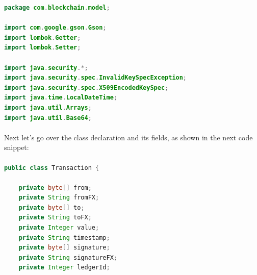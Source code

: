 \documentclass[12pt,a4paper]{report}
\begin{document}
 
\begin{lstlisting}[language=Java]
package com.blockchain.model;

import com.google.gson.Gson;
import lombok.Getter;
import lombok.Setter;

import java.security.*;
import java.security.spec.InvalidKeySpecException;
import java.security.spec.X509EncodedKeySpec;
import java.time.LocalDateTime;
import java.util.Arrays;
import java.util.Base64;
\end{lstlisting}
\paragraph{}
Next let’s go over the class declaration and its fields, as shown in the next code snippet:
\paragraph{}

\begin{lstlisting}[language=Java]
public class Transaction {

    private byte[] from;
    private String fromFX;
    private byte[] to;
    private String toFX;
    private Integer value;
    private String timestamp;
    private byte[] signature;
    private String signatureFX;
    private Integer ledgerId;
\end{lstlisting}
\end{document}
